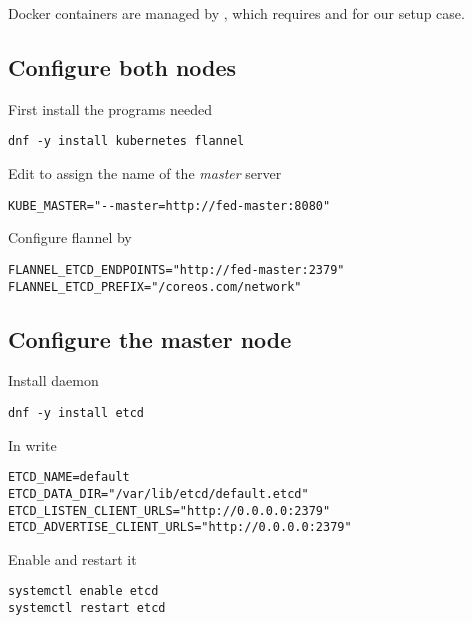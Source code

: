 Docker containers are managed by ,
which requires  and
 for our setup case.

\subsection{Configure both nodes}
\label{subsec:setup-kuber-both}

First install the programs needed

\begin{lstlisting}
dnf -y install kubernetes flannel
\end{lstlisting}

Edit  to assign the
name of the \emph{master} server

\begin{lstlisting}
KUBE_MASTER="--master=http://fed-master:8080"
\end{lstlisting}

Configure flannel by 

\begin{lstlisting}
FLANNEL_ETCD_ENDPOINTS="http://fed-master:2379"
FLANNEL_ETCD_PREFIX="/coreos.com/network"
\end{lstlisting}

\subsection{Configure the master node}
\label{subsec:setup-kuber-master}

Install  daemon

\begin{lstlisting}
dnf -y install etcd
\end{lstlisting}

In  write

\begin{lstlisting}
ETCD_NAME=default
ETCD_DATA_DIR="/var/lib/etcd/default.etcd"
ETCD_LISTEN_CLIENT_URLS="http://0.0.0.0:2379"
ETCD_ADVERTISE_CLIENT_URLS="http://0.0.0.0:2379"
\end{lstlisting}

Enable and restart it

\begin{lstlisting}
systemctl enable etcd
systemctl restart etcd
\end{lstlisting}


